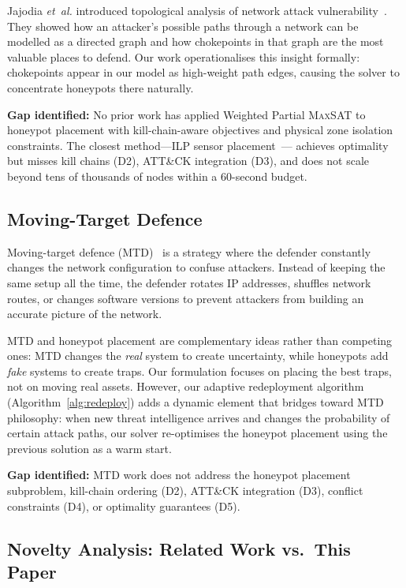 \documentclass[journal]{IEEEtran}
\newcommand{\etal}{\emph{et~al.}}
\newcommand{\maxsat}{\textsc{MaxSAT}}
\begin{document}
Jajodia \etal{} introduced topological analysis of network
attack vulnerability~\cite{jajodia2005}.
They showed how an attacker's possible paths through a network
can be modelled as a directed graph and how chokepoints in
that graph are the most valuable places to defend.
Our work operationalises this insight formally: chokepoints
appear in our model as high-weight path edges, causing the
solver to concentrate honeypots there naturally.

\textbf{Gap identified:} No prior work has applied Weighted
Partial \maxsat{} to honeypot placement with kill-chain-aware
objectives and physical zone isolation constraints.
The closest method---ILP sensor placement~\cite{saha2015}---
achieves optimality but misses kill chains (D2), ATT\&CK
integration (D3), and does not scale beyond tens of thousands
of nodes within a 60-second budget.

\subsection{Moving-Target Defence}

Moving-target defence (MTD)~\cite{zhu2013} is a strategy
where the defender constantly changes the network
configuration to confuse attackers.
Instead of keeping the same setup all the time, the defender
rotates IP addresses, shuffles network routes, or changes
software versions to prevent attackers from building an
accurate picture of the network.

MTD and honeypot placement are complementary ideas rather
than competing ones: MTD changes the \emph{real} system to
create uncertainty, while honeypots add \emph{fake} systems
to create traps.
Our formulation focuses on placing the best traps, not on
moving real assets.
However, our adaptive redeployment algorithm
(Algorithm~\ref{alg:redeploy}) adds a dynamic element that
bridges toward MTD philosophy: when new threat intelligence
arrives and changes the probability of certain attack paths,
our solver re-optimises the honeypot placement using the
previous solution as a warm start.

\textbf{Gap identified:} MTD work does not address the
honeypot placement subproblem, kill-chain ordering (D2),
ATT\&CK integration (D3), conflict constraints (D4), or
optimality guarantees (D5).

\subsection{Novelty Analysis: Related Work vs.\ This Paper}
\label{subsec:novelty}
\end{document}

